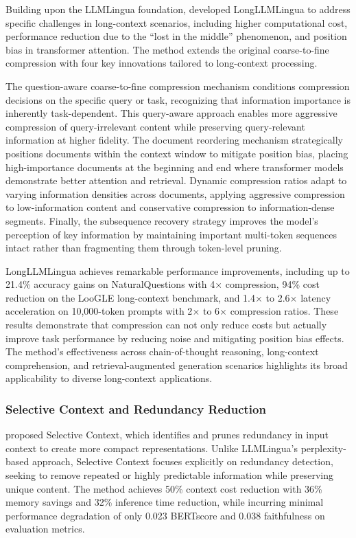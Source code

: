 \documentclass[11pt,letterpaper]{article}
\begin{document}
Building upon the LLMLingua foundation, \cite{jiang2024longllmlingua} developed LongLLMLingua to address specific challenges in long-context scenarios, including higher computational cost, performance reduction due to the ``lost in the middle'' phenomenon, and position bias in transformer attention. The method extends the original coarse-to-fine compression with four key innovations tailored to long-context processing.

The question-aware coarse-to-fine compression mechanism conditions compression decisions on the specific query or task, recognizing that information importance is inherently task-dependent. This query-aware approach enables more aggressive compression of query-irrelevant content while preserving query-relevant information at higher fidelity. The document reordering mechanism strategically positions documents within the context window to mitigate position bias, placing high-importance documents at the beginning and end where transformer models demonstrate better attention and retrieval. Dynamic compression ratios adapt to varying information densities across documents, applying aggressive compression to low-information content and conservative compression to information-dense segments. Finally, the subsequence recovery strategy improves the model's perception of key information by maintaining important multi-token sequences intact rather than fragmenting them through token-level pruning.

LongLLMLingua achieves remarkable performance improvements, including up to 21.4\% accuracy gains on NaturalQuestions with 4$\times$ compression, 94\% cost reduction on the LooGLE long-context benchmark, and 1.4$\times$ to 2.6$\times$ latency acceleration on 10,000-token prompts with 2$\times$ to 6$\times$ compression ratios. These results demonstrate that compression can not only reduce costs but actually improve task performance by reducing noise and mitigating position bias effects. The method's effectiveness across chain-of-thought reasoning, long-context comprehension, and retrieval-augmented generation scenarios highlights its broad applicability to diverse long-context applications.

\subsubsection{Selective Context and Redundancy Reduction}

\cite{li2023compressing} proposed Selective Context, which identifies and prunes redundancy in input context to create more compact representations. Unlike LLMLingua's perplexity-based approach, Selective Context focuses explicitly on redundancy detection, seeking to remove repeated or highly predictable information while preserving unique content. The method achieves 50\% context cost reduction with 36\% memory savings and 32\% inference time reduction, while incurring minimal performance degradation of only 0.023 BERTscore and 0.038 faithfulness on evaluation metrics.
\end{document}
